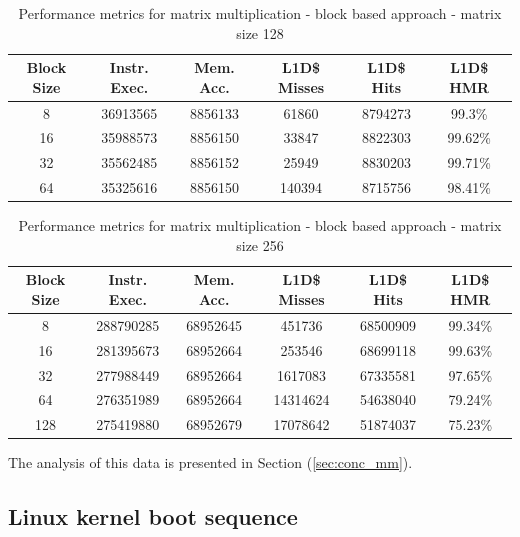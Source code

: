 \begin{center}
\begin{table}[!htbp]
\centering
\begin{tabular}{|c|c|c|c|c|c|}
\hline
\textbf{Block Size} & \textbf{Instr. Exec.} & \textbf{Mem. Acc.} & \textbf{L1D\$ Misses} & \textbf{L1D\$ Hits} & \textbf{L1D\$ HMR} \\ \hline
8 & 36913565 & 8856133 & 61860 & 8794273 & 99.3\% \\ \hline
16 & 35988573 & 8856150 & 33847 & 8822303 & 99.62\% \\ \hline
32 & 35562485 & 8856152 & 25949 & 8830203 & 99.71\% \\ \hline
64 & 35325616 & 8856150 & 140394 & 8715756 & 98.41\% \\ \hline
\end{tabular}
\caption{Performance metrics for matrix multiplication - block based approach - matrix size 128}
\label{tab:performance_metrics_128}
\end{table}
\end{center}

\begin{center}
\begin{table}[!htbp]
\centering
\begin{tabular}{|c|c|c|c|c|c|}
\hline
\textbf{Block Size} & \textbf{Instr. Exec.} & \textbf{Mem. Acc.} & \textbf{L1D\$ Misses} & \textbf{L1D\$ Hits} & \textbf{L1D\$ HMR} \\ \hline
8 & 288790285 & 68952645 & 451736 & 68500909 & 99.34\% \\ \hline
16 & 281395673 & 68952664 & 253546 & 68699118 & 99.63\% \\ \hline
32 & 277988449 & 68952664 & 1617083 & 67335581 & 97.65\% \\ \hline
64 & 276351989 & 68952664 & 14314624 & 54638040 & 79.24\% \\ \hline
128 & 275419880 & 68952679 & 17078642 & 51874037 & 75.23\% \\ \hline
\end{tabular}
\caption{Performance metrics for matrix multiplication - block based approach - matrix size 256}
\label{tab:performance_metrics_256}
\end{table}
\end{center}
\noindent The analysis of this data is presented in Section (\ref{sec:conc_mm}).

\subsection{Linux kernel boot sequence}

